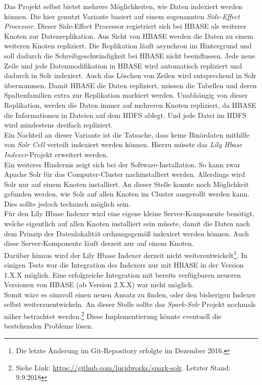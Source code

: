 \noindent
Das Projekt selbst bietet mehrere Möglichkeiten, wie Daten indexiert werden können. Die hier genutzt Variante basiert auf einem sogenannten \textit{Side-Effect Processor}.\cite{hbase_sep} 
Dieser Side-Effect Processor registriert sich bei HBASE als weiterer Knoten zur Datenreplikation. Aus Sicht von HBASE werden die Daten zu einem weiteren Knoten repliziert. Die Replikation läuft asynchron im Hintergrund und soll dadurch die Schreibgeschwindigkeit bei HBASE nicht beeinflussen. Jede neue Zeile und jede Datenmodifikation in HBASE wird automatisch repliziert und dadurch in Solr indexiert.
Auch das Löschen von Zeilen wird entsprechend in Solr übernommen. Damit HBASE die Daten repliziert, müssen die Tabellen und deren Spaltenfamilien extra zur Replikation markiert werden. Unabhängig von dieser Replikation, werden die Daten immer auf mehreren Knoten repliziert, da HBASE die Informationen in Dateien auf dem HDFS ablegt. Und jede Datei im HDFS wird mindestens dreifach repliziert.\\

\noindent
Ein Nachteil an dieser Variante ist die Tatsache, dass keine Binärdaten mithilfe von \textit{Solr Cell} verteilt indexiert werden können. Hierzu müsste das \textit{Lily Hbase Indexer}-Projekt erweitert werden.\\
Ein weiteres Hindernis zeigt sich bei der Software-Installation. So kann zwar Apache Solr für das Computer-Cluster nachinstalliert werden. Allerdings wird Solr nur auf einem Knoten installiert. An dieser Stelle konnte noch Möglichkeit gefunden werden, wie Solr auf allen Knoten im Cluster ausgerollt werden kann. Dies sollte jedoch technisch möglich sein.\\
Für den Lily Hbase Indexer wird eine eigene kleine Server-Komponente benötigt, welche eigentlich auf allen Knoten installiert sein müsste, damit die Daten nach dem Prinzip der Datenlokalität ordnungsgemäß indexiert werden können. Auch diese Server-Komponente läuft derzeit nur auf einem Knoten.\\
Darüber hinaus wird der Lily Hbase Indexer derzeit nicht weiterentwickelt\footnote{Die letzte Änderung im Git-Repository erfolgte im Dezember 2016.}. In einigen Tests war die Integration des Indexers nur mit HBASE in der Version 1.X.X möglich. Eine erfolgreiche Integration mit bereits verfügbaren neueren Versionen von HBASE  (ab Version 2.X.X) war nicht möglich.\\ 

\noindent
Somit wäre es sinnvoll einen neuen Ansatz zu finden, oder den bisherigen Indexer selbst weiterzuentwickeln. An dieser Stelle sollte das \textit{Spark-Solr} Projekt nochmals näher betrachtet werden.\footnote{Siehe Link: \url{https://github.com/lucidworks/spark-solr}. Letzter Stand: 9.9.2018} Diese Implementierung könnte eventuell die bestehenden Probleme lösen. 



